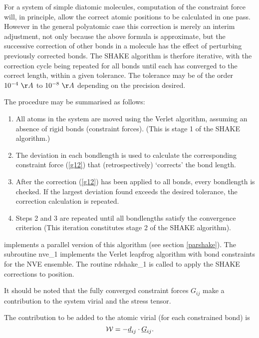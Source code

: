 For a system of simple diatomic molecules, computation of the
constraint force will, in principle, allow the correct atomic
positions to be calculated in one pass.  However in the general
polyatomic case this correction is merely an interim adjustment, not
only because the above formula is approximate, but the successive
correction of other bonds in a molecule has the effect of perturbing
previously corrected bonds. The SHAKE algorithm is therfore iterative,
with the correction cycle being repeated for all bonds until each has
converged to the correct length, within a given tolerance.  The
tolerance may be of the order $10^{-4}~\AA$ to $10^{-8}~\AA$ depending
on the precision desired.

The procedure may be summarised as follows:
\begin{enumerate}
\item All atoms in the system are moved using the Verlet algorithm, 
assuming an absence of rigid bonds 
(constraint forces).  (This is
stage 1 of the SHAKE algorithm.)
\item The deviation in each bondlength is used to calculate the 
corresponding constraint force (\ref{g12}) that (retrospectively)
`corrects' the bond length.
\item After the correction (\ref{g12}) has been applied to all bonds, every
bondlength is checked. If the largest deviation found exceeds the
desired tolerance, the correction calculation is repeated.
\item Steps 2 and 3 are repeated until all bondlengths satisfy the 
convergence criterion (This iteration constitutes stage 2 of the SHAKE
algorithm).
\end{enumerate}

\D{} implements a parallel version of this algorithm
\cite{smith-94b} (see section \ref{parshake}).  The
subroutine {\sc nve\_1} implements the Verlet
leapfrog algorithm with bond constraints for
the NVE ensemble. The routine {\sc rdshake\_1} is called to apply the
SHAKE corrections to position.

It should be noted that the fully converged constraint forces
$G_{ij}$ make a contribution to the system virial and the stress
tensor.

The contribution to be added to the atomic virial (for each constrained
bond) is
\begin{equation}
{\cal W}=-\mbox{$\underline{d}$}_{ij}\cdot\mbox{$\underline{G}$}_{ij}.
\end{equation}


